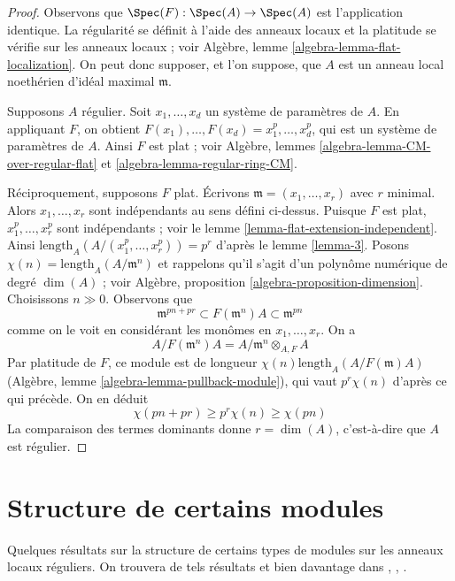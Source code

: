 \begin{proof}
Observons que $\Spec(F) : \Spec(A) \to \Spec(A)$ est l'application identique. La régularité se définit à l'aide des anneaux locaux et la platitude se vérifie sur les anneaux locaux ; voir Algèbre, lemme \ref{algebra-lemma-flat-localization}. On peut donc supposer, et l'on suppose, que $A$ est un anneau local noethérien d'idéal maximal $\mathfrak m$.

\medskip\noindent
Supposons $A$ régulier. Soit $x_1, \ldots, x_d$ un système de paramètres de $A$. En appliquant $F$, on obtient $F(x_1), \ldots, F(x_d) = x_1^p, \ldots, x_d^p$, qui est un système de paramètres de $A$. Ainsi $F$ est plat ; voir Algèbre, lemmes \ref{algebra-lemma-CM-over-regular-flat} et \ref{algebra-lemma-regular-ring-CM}.

\medskip\noindent
Réciproquement, supposons $F$ plat. Écrivons $\mathfrak m = (x_1, \ldots, x_r)$ avec $r$ minimal. Alors $x_1, \ldots, x_r$ sont indépendants au sens défini ci-dessus. Puisque $F$ est plat, $x_1^p, \ldots, x_r^p$ sont indépendants ; voir le lemme \ref{lemma-flat-extension-independent}. Ainsi $\text{length}_A(A/(x_1^p, \ldots, x_r^p)) = p^r$ d'après le lemme \ref{lemma-3}. Posons $\chi(n) = \text{length}_A(A/\mathfrak m^n)$ et rappelons qu'il s'agit d'un polynôme numérique de degré $\dim(A)$ ; voir Algèbre, proposition \ref{algebra-proposition-dimension}. Choisissons $n \gg 0$. Observons que
$$
\mathfrak m^{pn + pr} \subset F(\mathfrak m^n)A \subset \mathfrak m^{pn}
$$
comme on le voit en considérant les monômes en $x_1, \ldots, x_r$. On a
$$
A/F(\mathfrak m^n)A = A/\mathfrak m^n \otimes_{A, F} A
$$
Par platitude de $F$, ce module est de longueur $\chi(n) \text{length}_A(A/F(\mathfrak m)A)$ (Algèbre, lemme \ref{algebra-lemma-pullback-module}), qui vaut $p^r\chi(n)$ d'après ce qui précède. On en déduit
$$
\chi(pn + pr) \geq p^r\chi(n) \geq \chi(pn)
$$
La comparaison des termes dominants donne $r = \dim(A)$, c'est-à-dire que $A$ est régulier.
\end{proof}




\section{Structure de certains modules}
\label{section-structure}

\noindent
Quelques résultats sur la structure de certains types de modules sur les anneaux locaux réguliers. On trouvera de tels résultats et bien davantage dans \cite{Huneke-Sharp}, \cite{Lyubeznik}, \cite{Lyubeznik2}.

